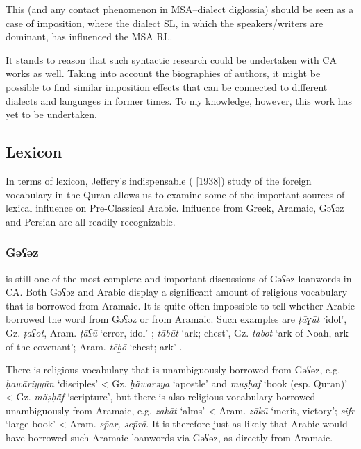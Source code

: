 \documentclass[output=paper]{langsci/langscibook}
\begin{document}
This (and any contact phenomenon in MSA–dialect diglossia) should be seen as a case of imposition, where the dialect SL, in which the speakers/writers are dominant, has influenced the MSA RL. 

It stands to reason that such syntactic research could be undertaken with CA works as well. Taking into account the biographies of authors, it might be possible to find similar imposition effects that can be connected to different dialects and languages in former times. To my knowledge, however, this work has yet to be undertaken.

\subsection{Lexicon}

In terms of lexicon, Jeffery’s indispensable (\citeyear{Jeffrey2007} [1938]) study of the foreign vocabulary in the Quran allows us to examine some of the important sources of lexical influence on Pre-Classical Arabic. Influence from Greek, Aramaic, Gəʕəz and Persian are all readily recognizable. 

\subsubsection{\label{bkm:Ref13224677}Gəʕəz}

\citet{Nöldeke1910} is still one of the most complete and important discussions of Gəʕəz loanwords in CA. Both Gəʕəz and Arabic display a significant amount of religious vocabulary that is borrowed from Aramaic. It is quite often impossible to tell whether Arabic borrowed the word from Gəʕəz or from Aramaic. Such examples are \textit{ṭāɣūt} ‘idol’, Gz. \textit{ṭaʕot}, Aram. \textit{ṭāʕū} ‘error, idol’ \citep[48]{Nöldeke1910}; \textit{tābūt} ‘ark; chest’, Gz. \textit{tabot} ‘ark of Noah, ark of the covenant’; Aram. \textit{tēḇō} ‘chest; ark’ \citep[49]{Nöldeke1910}.

There is religious vocabulary that is unambiguously borrowed from Gəʕəz, e.g. \textit{ḥawāriyyūn} ‘disciples’ < Gz. \textit{ḥäwarəya} ‘apostle’ and \textit{muṣḥaf} ‘book (esp. Quran)’ < Gz. \textit{mäṣḥäf} ‘scripture’, but there is also religious vocabulary borrowed unambiguously from Aramaic, e.g. \textit{zakāt} ‘alms’ < Aram. \textit{zāḵū} ‘merit, victory’; \textit{sifr} ‘large book’ < Aram. \textit{sp̄ar, sep̄rā}. It is therefore just as likely that Arabic would have borrowed such Aramaic loanwords via Gəʕəz, as directly from Aramaic.
\end{document}
